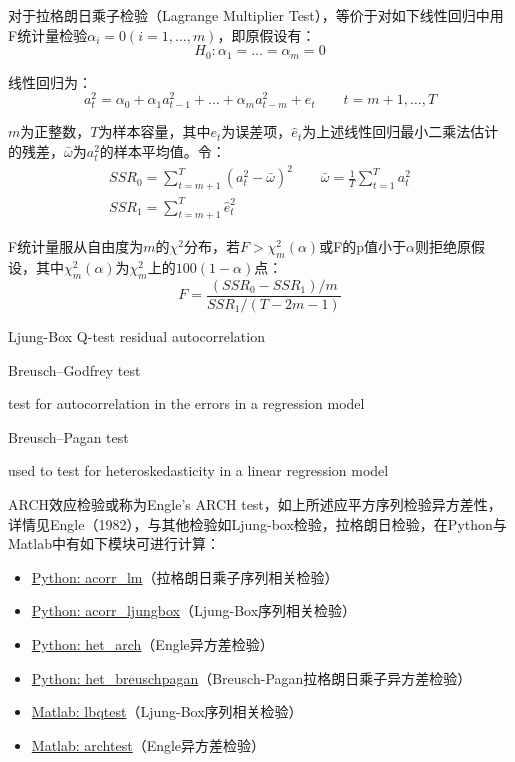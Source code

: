 \documentclass[11pt]{article}
\begin{document}
对于拉格朗日乘子检验（Lagrange Multiplier Test），等价于对如下线性回归中用F统计量检验$\alpha_i=0(i=1,\dots,m)$，即原假设有：
\begin{equation*}
    H_0: \alpha_1 = \dots = \alpha_m = 0
\end{equation*}

线性回归为：
\begin{equation*}
    a^2_t = \alpha_0 + \alpha_1 a^{2}_{t-1} + \dots + \alpha_m a^{2}_{t-m} + e_t \qquad t=m+1,\dots,T
\end{equation*}

$m$为正整数，$T$为样本容量，其中$e_t$为误差项，$\hat{e}_t$为上述线性回归最小二乘法估计的残差，$\bar{\omega}$为$a_t^2$的样本平均值。令：
\begin{gather*}
    SSR_0 = \sum_{t=m+1}^{T} (a_t^2 - \bar{\omega})^2 \qquad
    \bar{\omega} = \frac{1}{T} \sum_{t=1}^{T} a_t^2 \\
    SSR_1 = \sum_{t=m+1}^{T} \hat{e}_t^2
\end{gather*}

F统计量服从自由度为$m$的$\chi^2$分布，若$F>\chi_m^2(\alpha)$或F的p值小于$\alpha$则拒绝原假设，其中$\chi_m^2(\alpha)$为$\chi_m^2$上的$100(1-\alpha)$点：
\begin{equation*}
    F = \frac{(SSR_0-SSR_1)/m}{SSR_1/(T-2m-1)}
\end{equation*}

Ljung-Box Q-test
residual autocorrelation

Breusch–Godfrey test

test for autocorrelation in the errors in a regression model

Breusch–Pagan test

used to test for heteroskedasticity in a linear regression model

\begin{remark}
    ARCH效应检验或称为Engle's ARCH test，如上所述应平方序列检验异方差性，详情见Engle（1982），与其他检验如Ljung-box检验，拉格朗日检验，在Python与Matlab中有如下模块可进行计算：
    \begin{itemize}
        \item \href{https://www.statsmodels.org/stable/generated/statsmodels.stats.diagnostic.acorr_lm.html}{Python: acorr\_lm}（拉格朗日乘子序列相关检验）
        \item \href{https://www.statsmodels.org/stable/generated/statsmodels.stats.diagnostic.acorr\_ljungbox.html}{Python: acorr\_ljungbox}（Ljung-Box序列相关检验）
        \item \href{https://www.statsmodels.org/stable/generated/statsmodels.stats.diagnostic.het\_arch.html}{Python: het\_arch}（Engle异方差检验）
        \item \href{https://www.statsmodels.org/stable/generated/statsmodels.stats.diagnostic.het\_breuschpagan.html}{Python: het\_breuschpagan}（Breusch-Pagan拉格朗日乘子异方差检验）
        \item \href{https://www.mathworks.com/help/econ/lbqtest.html}{Matlab: lbqtest}（Ljung-Box序列相关检验）
        \item \href{https://www.mathworks.com/help/econ/archtest.html}{Matlab: archtest}（Engle异方差检验）
    \end{itemize}
\end{remark}
\end{document}
